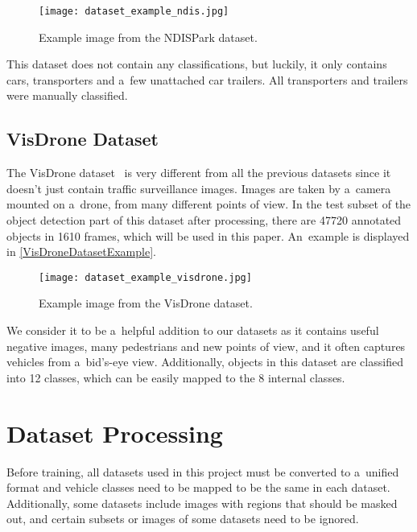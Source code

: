 \begin{figure}[t]
    \centering
    \texttt{[image: dataset\_example\_ndis.jpg]}
    \captionsetup{width=0.7\textwidth}
    \caption{Example image from the NDISPark dataset.}
    \label{NDISDatasetExample}
\end{figure}

This dataset does not contain any classifications, but luckily, it only contains
cars, transporters and a~few unattached car trailers. All transporters and
trailers were manually classified.


\subsection{VisDrone Dataset}

The VisDrone dataset~\cite{Zhu2022} is very different from all the previous
datasets since it doesn't just contain traffic surveillance images. Images are
taken by a~camera mounted on a~drone, from many different points of view. In the
test subset of the object detection part of this dataset after processing, there
are \num{47720} annotated objects in \num{1610} frames, which will be used in
this paper. An~example is displayed in \autoref{VisDroneDatasetExample}.

\begin{figure}[t]
    \centering
    \texttt{[image: dataset\_example\_visdrone.jpg]}
    \caption{Example image from the VisDrone dataset.}
    \label{VisDroneDatasetExample}
\end{figure}

We consider it to be a~helpful addition to our datasets as it contains useful
negative images, many pedestrians and new points of view, and it often captures
vehicles from a~bid's-eye view. Additionally, objects in this dataset are
classified into 12 classes, which can be easily mapped to the 8
internal classes.


\section{Dataset Processing}

Before training, all datasets used in this project must be converted to
a~unified format and vehicle classes need to be mapped to be the same in each dataset.
Additionally, some datasets include images with regions that should be masked
out, and certain subsets or images of some datasets need to be ignored.

